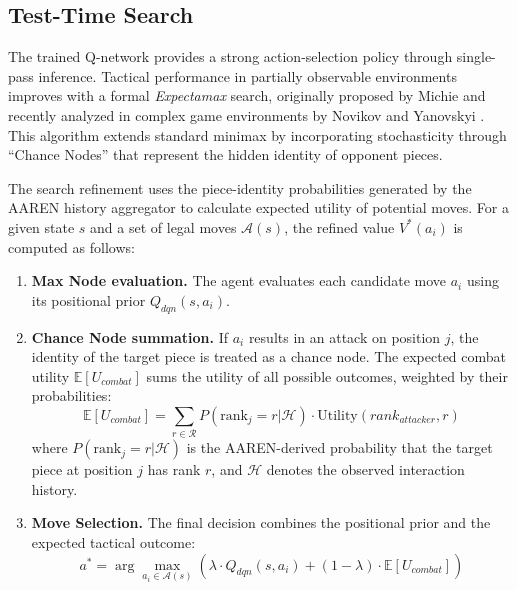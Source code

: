 \subsection{Test-Time Search}

The trained Q-network provides a strong action-selection policy through single-pass inference. Tactical performance in partially observable environments improves with a formal \textit{Expectamax} search, originally proposed by Michie \cite{novikov2024analysis} and recently analyzed in complex game environments by Novikov and Yanovskyi \cite{novikov2024analysis}. This algorithm extends standard minimax by incorporating stochasticity through ``Chance Nodes'' that represent the hidden identity of opponent pieces.

The search refinement uses the piece-identity probabilities generated by the AAREN history aggregator to calculate expected utility of potential moves. For a given state $s$ and a set of legal moves $\mathcal{A}(s)$, the refined value $V^*(a_i)$ is computed as follows:

\begin{enumerate}
    \item \textbf{Max Node evaluation.} The agent evaluates each candidate move $a_i$ using its positional prior $Q_{dqn}(s, a_i)$.
    \item \textbf{Chance Node summation.} If $a_i$ results in an attack on position $j$, the identity of the target piece is treated as a chance node. The expected combat utility $\mathbb{E}[U_{combat}]$ sums the utility of all possible outcomes, weighted by their probabilities:
    \begin{equation}
        \mathbb{E}[U_{combat}] = \sum_{r \in \mathcal{R}} P(\text{rank}_j = r | \mathcal{H}) \cdot \text{Utility}(rank_{attacker}, r)
    \end{equation}
    where $P(\text{rank}_j = r | \mathcal{H})$ is the AAREN-derived probability that the target piece at position $j$ has rank $r$, and $\mathcal{H}$ denotes the observed interaction history.
    \item \textbf{Move Selection.} The final decision combines the positional prior and the expected tactical outcome:
    \begin{equation}
        a^* = \arg\max_{a_i \in \mathcal{A}(s)} \left( \lambda \cdot Q_{dqn}(s, a_i) + (1-\lambda) \cdot \mathbb{E}[U_{combat}] \right)
    \end{equation}
\end{enumerate}

